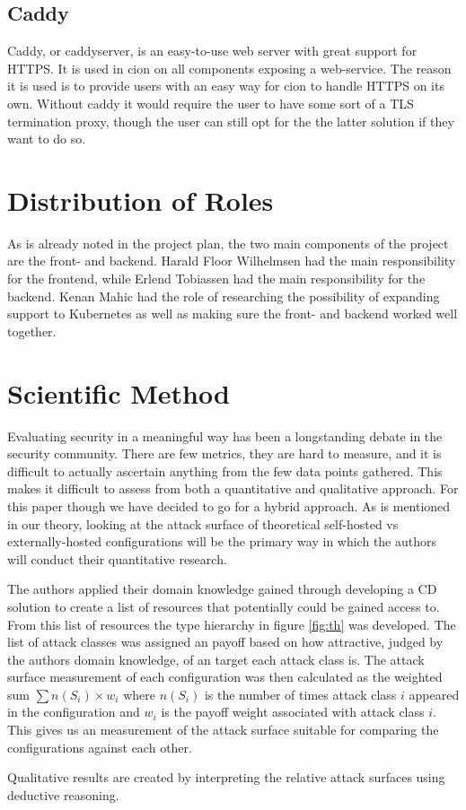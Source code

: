 \subsection{Caddy}
Caddy, or caddyserver, is an easy-to-use web server with great support for HTTPS\cite{caddyserver}. It is used in cion on all components exposing a web-service. The reason it is used is to provide users with an easy way for cion to handle HTTPS on its own. Without caddy it would require the user to have some sort of a TLS termination proxy, though the user can still opt for the the latter solution if they want to do so.

\section{Distribution of Roles}
As is already noted in the project plan, the two main components of the project are the front- and backend. Harald Floor Wilhelmsen had the main responsibility for the frontend, while Erlend Tobiassen had the main responsibility for the backend. Kenan Mahic had the role of researching the possibility of expanding support to Kubernetes as well as making sure the front- and backend worked well together.

\section{Scientific Method}
Evaluating security in a meaningful way has been a longstanding debate in the security community. There are few metrics, they are hard to measure, and it is difficult to actually ascertain anything from the few data points gathered. This makes it difficult to assess from both a quantitative and qualitative approach. For this paper though we have decided to go for a hybrid approach. As is mentioned in our theory, looking at the attack surface of theoretical self-hosted vs externally-hosted configurations will be the primary way in which the authors will conduct their quantitative research.

The authors applied their domain knowledge gained through developing a CD solution to create a list of resources that potentially could be gained access to. From this list of resources the type hierarchy in figure \ref{fig:th} was developed. The list of attack classes was assigned an payoff based on how attractive, judged by the authors domain knowledge, of an target each attack class is. The attack surface measurement of each configuration was then calculated as the weighted sum $\sum n(S_i)\times w_i$ where $n(S_i)$ is the number of times attack class $i$ appeared in the configuration and $w_i$ is the payoff weight associated with attack class $i$. This gives us an measurement of the attack surface suitable for comparing the configurations against each other.

Qualitative results are created by interpreting the relative attack surfaces using deductive reasoning.